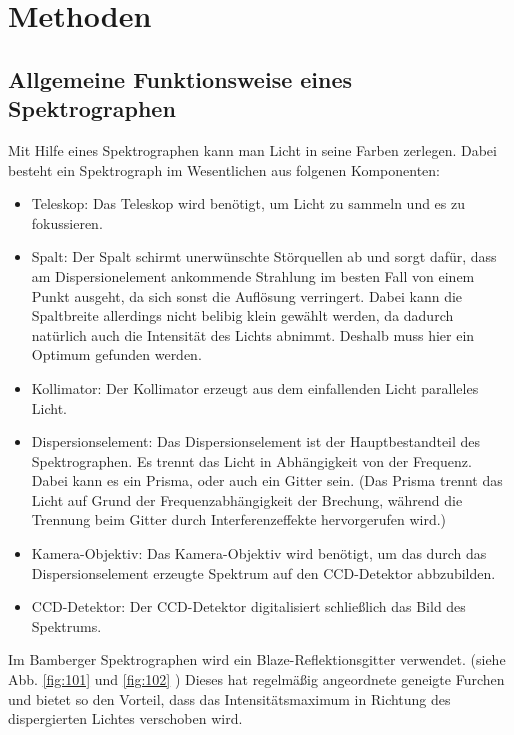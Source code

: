 \section{Methoden}

\subsection{Allgemeine Funktionsweise eines Spektrographen}
Mit Hilfe eines Spektrographen kann man Licht in seine Farben zerlegen. Dabei besteht ein Spektrograph im Wesentlichen aus folgenen Komponenten:

\begin{itemize}

\item Teleskop: Das Teleskop wird benötigt, um Licht zu sammeln und es zu fokussieren.

\item Spalt: Der Spalt schirmt unerwünschte Störquellen ab und sorgt dafür, dass am Dispersionelement ankommende Strahlung im besten Fall von einem Punkt ausgeht, da sich sonst die Auflösung verringert. Dabei kann die Spaltbreite allerdings nicht belibig klein gewählt  werden, da dadurch natürlich auch die Intensität des Lichts abnimmt. Deshalb muss hier ein Optimum gefunden werden.

\item Kollimator: Der Kollimator erzeugt aus dem einfallenden Licht paralleles Licht.

\item Dispersionselement: Das Dispersionselement ist der Hauptbestandteil des Spektrographen. Es trennt das Licht in Abhängigkeit von der Frequenz. Dabei kann es ein Prisma, oder auch ein Gitter sein. (Das Prisma trennt das Licht auf Grund der Frequenzabhängigkeit der Brechung, während die Trennung beim Gitter durch Interferenzeffekte hervorgerufen wird.)

\item Kamera-Objektiv: Das Kamera-Objektiv wird benötigt, um das durch das Dispersionselement erzeugte Spektrum auf den CCD-Detektor abbzubilden.

\item CCD-Detektor: Der CCD-Detektor digitalisiert schließlich das Bild des Spektrums.

\end{itemize}

Im Bamberger Spektrographen wird ein Blaze-Reflektionsgitter verwendet. (siehe Abb. \ref{fig:101} und \ref{fig:102} ) Dieses hat regelmäßig angeordnete geneigte Furchen und bietet so den Vorteil, dass das Intensitätsmaximum in Richtung des dispergierten Lichtes verschoben wird. 

